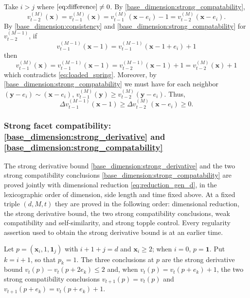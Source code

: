 \documentclass[12pt]{amsart}
\begin{document}
Take $i > j$ where $\eqref{eq:difference} \not = 0$. By \eqref{base_dimension:strong_compatability}, 
\begin{equation} \label{eq:loaded_spring}
v_{t-2}^{(M)}(\mathbf{x}) =  v_{t-1}^{(M)}(\mathbf{x}) =  v_{t-1}^{(M)}(\mathbf{x}-e_i)-1 = v_{t-2}^{(M)}(\mathbf{x}-e_i).
\end{equation}
By \eqref{base_dimension:consistency} and \eqref{base_dimension:strong_compatability} for $v_{t-2}^{(M-1)}$, if
\[
v_{t-1}^{(M-1)}(\mathbf{x}-1) =  v_{t-1}^{(M-1)}(\mathbf{x}-1+e_i)+1
\]
then 
\[
v_{t-1}^{(M)}(\mathbf{x}) = v_{t-1}^{(M-1)}(\mathbf{x}-1) =  v_{t-2}^{(M-1)}(\mathbf{x}-1)+1 = v_{t-2}^{(M)}(\mathbf{x}) + 1
\]
which contradicts \eqref{eq:loaded_spring}. Moreover, 
by \eqref{base_dimension:strong_compatability}
we must have for each neighbor $(\mathbf{y}-e_i) \sim (\mathbf{x} - e_i)$, $v_{t-1}^{(M)}(\mathbf{y}) \geq v_{t-2}^{(M)}(\mathbf{y}-e_i)$. Thus, 
\begin{equation} 
\Delta v_{t-1}^{(M-1)}(\mathbf{x}-1) \geq  \Delta v_{t-2}^{(M)}(\mathbf{x}-e_i) \geq 0.
\end{equation}



\subsubsection*{Strong facet compatibility: \eqref{base_dimension:strong_derivative}
    and \eqref{base_dimension:strong_compatability}} \label{subsubsec:higher_strong_facet}

The strong derivative bound \eqref{base_dimension:strong_derivative} and the two strong compatibility conclusions \eqref{base_dimension:strong_compatability} are proved jointly with dimensional reduction \eqref{eq:reduction_gen_d}, in the lexicographic order of dimension, side length and time fixed above. At a fixed triple $(d,M,t)$ they are proved in the following order: dimensional reduction, the strong derivative bound, the two strong compatibility conclusions, weak compatibility and self-similarity, and strong topple control. Every regularity assertion used to obtain the strong derivative bound is at an earlier time.

Let $p=(\mathbf{x}_i,1,\mathbf{1}_j)$ with $i+1+j=d$ and $\mathbf{x}_i\geq2$; when $i=0$, $p=\mathbf{1}$. Put $k=i+1$, so that $p_k=1$. The three conclusions at $p$ are the strong derivative bound $v_t(p)-v_t(p+2e_k)\leq 2$ and, when $v_t(p)=v_t(p+e_k)+1$, the two strong compatibility conclusions $v_{t+1}(p)=v_t(p)$ and $v_{t+1}(p+e_k)=v_t(p+e_k)+1$.
\end{document}
